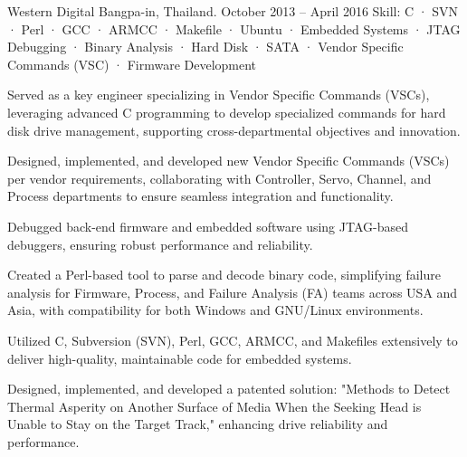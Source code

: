 \begin{cventries}
    {Western Digital} %
    {Bangpa-in, Thailand.} %
    {October 2013 -- April 2016} %
    {Skill: C · SVN · Perl · GCC · ARMCC · Makefile · Ubuntu · Embedded Systems · JTAG Debugging · Binary Analysis · Hard Disk · SATA · Vendor Specific Commands (VSC) · Firmware Development} %
    {
      \begin{cvitems} %
        \item {Served as a key engineer specializing in Vendor Specific Commands (VSCs), leveraging advanced C programming to develop specialized commands for hard disk drive management, supporting cross-departmental objectives and innovation.}
        \item {Designed, implemented, and developed new Vendor Specific Commands (VSCs) per vendor requirements, collaborating with Controller, Servo, Channel, and Process departments to ensure seamless integration and functionality.}
        \item {Debugged back-end firmware and embedded software using JTAG-based debuggers, ensuring robust performance and reliability.}
        \item {Created a Perl-based tool to parse and decode binary code, simplifying failure analysis for Firmware, Process, and Failure Analysis (FA) teams across USA and Asia, with compatibility for both Windows and GNU/Linux environments.}
        \item {Utilized C, Subversion (SVN), Perl, GCC, ARMCC, and Makefiles extensively to deliver high-quality, maintainable code for embedded systems.}
        \item {Designed, implemented, and developed a patented solution: "Methods to Detect Thermal Asperity on Another Surface of Media When the Seeking Head is Unable to Stay on the Target Track," enhancing drive reliability and performance.}
      \end{cvitems}
    }

\end{cventries}
